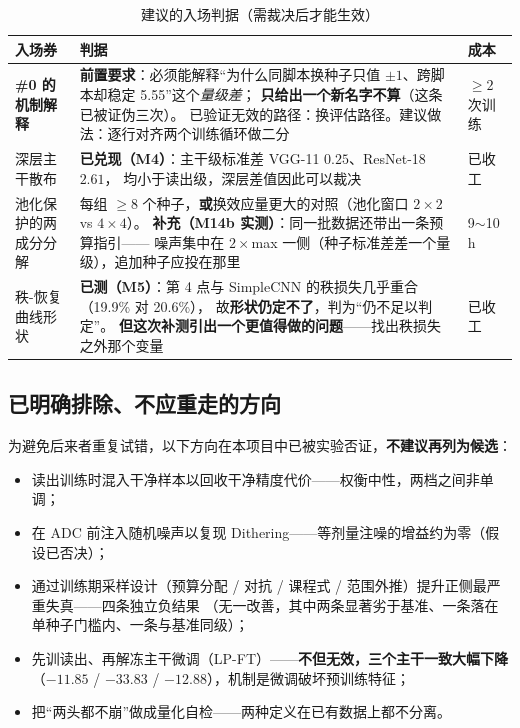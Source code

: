 \documentclass[11pt,a4paper]{ctexart}
\begin{document}
\begin{table}[h]
\centering
\caption{建议的入场判据（需裁决后才能生效）}
\label{tab:entry}
\small
\begin{tabular}{p{2.8cm}p{8.6cm}p{2.4cm}}
\toprule
入场券 & 判据 & 成本 \\
\midrule
\textbf{\#0 的机制解释}
& \textbf{前置要求}：必须能解释“为什么同脚本换种子只值 $\pm1$、跨脚本却稳定 5.55”这个\emph{量级差}；
  \textbf{只给出一个新名字不算}（这条已被证伪三次）。
  已验证无效的路径：换评估路径。建议做法：逐行对齐两个训练循环做二分
& $\ge2$ 次训练 \\
深层主干散布 & \textbf{已兑现（M4）}：主干级标准差 VGG-11 $0.25$、ResNet-18 $2.61$，
  均小于读出级，深层差值因此可以裁决 & 已收工 \\
池化保护的两成分分解 & 每组 $\ge8$ 个种子，\textbf{或}换效应量更大的对照（池化窗口 $2\times2$ vs $4\times4$）。
  \textbf{补充（M14b 实测）}：同一批数据还带出一条预算指引——
  噪声集中在 $2\times$max 一侧（种子标准差差一个量级），追加种子应投在那里 & 9$\sim$10 h \\
秩-恢复曲线形状 & \textbf{已测（M5）}：第 4 点与 SimpleCNN 的秩损失几乎重合（19.9\% 对 20.6\%），
  故\textbf{形状仍定不了}，判为“仍不足以判定”。
  \textbf{但这次补测引出一个更值得做的问题}——找出秩损失之外那个变量 & 已收工 \\
\bottomrule
\end{tabular}
\end{table}

\subsection{已明确排除、不应重走的方向}

为避免后来者重复试错，以下方向在本项目中已被实验否证，\textbf{不建议再列为候选}：

\begin{itemize}[leftmargin=2em,itemsep=2pt]
  \item 读出训练时混入干净样本以回收干净精度代价——权衡中性，两档之间非单调；
  \item 在 ADC 前注入随机噪声以复现 Dithering——等剂量注噪的增益约为零（假设已否决）；
  \item 通过训练期采样设计（预算分配 / 对抗 / 课程式 / 范围外推）提升正侧最严重失真——四条独立负结果
        （无一改善，其中两条显著劣于基准、一条落在单种子门槛内、一条与基准同级）；
  \item 先训读出、再解冻主干微调（LP-FT）——\textbf{不但无效，三个主干一致大幅下降}
        （$-11.85$ / $-33.83$ / $-12.88$），机制是微调破坏预训练特征；
  \item 把“两头都不崩”做成量化自检——两种定义在已有数据上都不分离。
\end{itemize}
\end{document}
